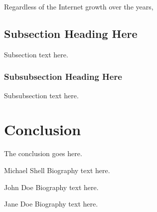 \documentclass[10pt,journal,compsoc]{IEEEtran}
\begin{document}
Regardless of the Internet growth over the years,

\subsection{Subsection Heading Here}
Subsection text here.

\subsubsection{Subsubsection Heading Here}
Subsubsection text here.

\section{Conclusion}
The conclusion goes here.




\begin{IEEEbiography}{Michael Shell}
Biography text here.
\end{IEEEbiography}

\begin{IEEEbiographynophoto}{John Doe}
Biography text here.
\end{IEEEbiographynophoto}

\begin{IEEEbiographynophoto}{Jane Doe}
Biography text here.
\end{IEEEbiographynophoto}
\end{document}

